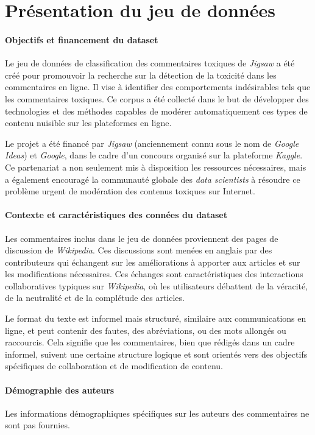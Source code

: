 
\chapter{Présentation du jeu de données}

\subsubsection*{Objectifs et financement du dataset}
Le jeu de données de classification des commentaires toxiques de \textit{Jigsaw} a été créé pour promouvoir la recherche sur la détection de la toxicité dans les commentaires en ligne.
Il vise à identifier des comportements indésirables tels que les commentaires toxiques.
Ce corpus a été collecté dans le but de développer des technologies et des méthodes capables de modérer automatiquement ces types de contenu nuisible sur les plateformes en ligne.

Le projet a été financé par \textit{Jigsaw} (anciennement connu sous le nom de \textit{Google Ideas}) et \textit{Google}, dans le cadre d'un concours organisé sur la plateforme \textit{Kaggle}. 
Ce partenariat a non seulement mis à disposition les ressources nécessaires, mais a également encouragé la communauté globale des \textit{data scientists} à résoudre ce problème urgent de modération des contenus toxiques sur Internet.

\subsubsection*{Contexte et caractéristiques des connées du dataset }
Les commentaires inclus dans le jeu de données proviennent des pages de discussion de \textit{Wikipedia}. 
Ces discussions sont menées en anglais par des contributeurs qui échangent sur les améliorations à apporter aux articles et sur les modifications nécessaires. 
Ces échanges sont caractéristiques des interactions collaboratives typiques sur \textit{Wikipedia}, où les utilisateurs débattent de la véracité, de la neutralité et de la complétude des articles.

Le format du texte est informel mais structuré, similaire aux communications en ligne, et peut contenir des fautes, des abréviations, ou des mots allongés ou raccourcis.
Cela signifie que les commentaires, bien que rédigés dans un cadre informel, suivent une certaine structure logique et sont orientés vers des objectifs spécifiques de collaboration et de modification de contenu.

\subsubsection*{Démographie des auteurs}
Les informations démographiques spécifiques sur les auteurs des commentaires ne sont pas fournies.

